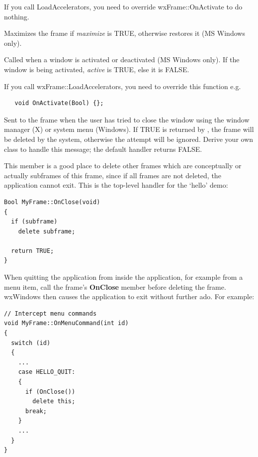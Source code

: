 If you call LoadAccelerators, you need to override wxFrame::OnActivate to do nothing.



Maximizes the frame if {\it maximize} is TRUE, otherwise restores it
(MS Windows only).



Called when a window is activated or deactivated (MS Windows
only). If the window is being activated, {\it active} is TRUE, else it
is FALSE.

If you call wxFrame::LoadAccelerators, you need to override this function e.g.

\begin{verbatim}
   void OnActivate(Bool) {};
\end{verbatim}

\label{wxframeonclose}


Sent to the frame when the user has tried to close the window using the
window manager (X) or system menu (Windows).  If TRUE is returned by
, the frame will be deleted by the system, otherwise the
attempt will be ignored. Derive your own class to handle this message;
the default handler returns FALSE.

This member is a good place to delete other frames which are
conceptually or actually subframes of this frame, since if all frames
are not deleted, the application cannot exit. This is the top-level
 handler for the `hello' demo:

\begin{verbatim}
Bool MyFrame::OnClose(void)
{
  if (subframe)
    delete subframe;

  return TRUE;
}
\end{verbatim}

When quitting the application from inside the application, for example
from a menu item, call the frame's {\bf OnClose} member before deleting
the frame. wxWindows then causes the application to exit without further
ado. For example:

\begin{verbatim}
// Intercept menu commands
void MyFrame::OnMenuCommand(int id)
{
  switch (id)
  {
    ...
    case HELLO_QUIT:
    {
      if (OnClose())
        delete this;
      break;
    }
    ...
  }
}
\end{verbatim}

